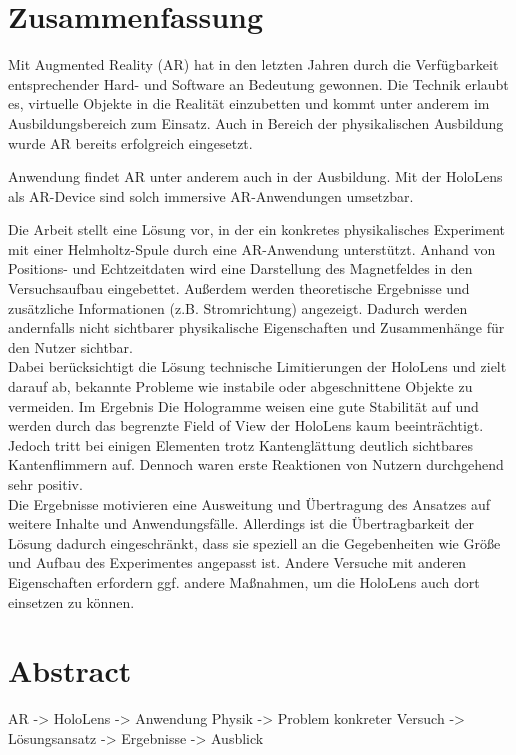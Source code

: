 \section*{Zusammenfassung}
Mit Augmented Reality (AR) hat in den letzten Jahren durch die Verfügbarkeit entsprechender Hard- und Software an Bedeutung gewonnen. Die Technik erlaubt es, virtuelle Objekte in die Realität einzubetten und kommt unter anderem im Ausbildungsbereich zum Einsatz. Auch in Bereich der physikalischen Ausbildung wurde AR bereits erfolgreich eingesetzt. 

Anwendung findet AR unter anderem auch in der Ausbildung. Mit der HoloLens als AR-Device sind solch immersive AR-Anwendungen umsetzbar. 

Die Arbeit stellt eine Lösung vor, in der ein konkretes physikalisches Experiment mit einer Helmholtz-Spule durch eine AR-Anwendung unterstützt. Anhand von Positions- und Echtzeitdaten wird eine Darstellung des Magnetfeldes in den Versuchsaufbau eingebettet. Außerdem werden theoretische Ergebnisse und zusätzliche Informationen (z.B. Stromrichtung) angezeigt. Dadurch werden andernfalls nicht sichtbarer physikalische Eigenschaften und Zusammenhänge für den Nutzer sichtbar.\\

\noindent\hspace*{5mm}
Dabei berücksichtigt die Lösung technische Limitierungen der HoloLens und zielt darauf ab, bekannte Probleme wie instabile oder abgeschnittene Objekte zu vermeiden. Im Ergebnis Die Hologramme weisen eine gute Stabilität auf und werden durch das begrenzte Field of View der HoloLens kaum beeinträchtigt. Jedoch tritt bei einigen Elementen trotz Kantenglättung deutlich sichtbares Kantenflimmern auf. Dennoch waren erste Reaktionen von Nutzern durchgehend sehr positiv.\\

\noindent\hspace*{5mm}
Die Ergebnisse motivieren eine Ausweitung und Übertragung des Ansatzes auf weitere Inhalte und Anwendungsfälle. Allerdings ist die Übertragbarkeit der Lösung dadurch eingeschränkt, dass sie speziell an die Gegebenheiten wie Größe und Aufbau des Experimentes angepasst ist. Andere Versuche mit anderen Eigenschaften erfordern ggf. andere Maßnahmen, um die HoloLens auch dort einsetzen zu können.

\section*{Abstract}
AR -> HoloLens -> Anwendung Physik -> Problem konkreter Versuch -> Lösungsansatz -> Ergebnisse -> Ausblick